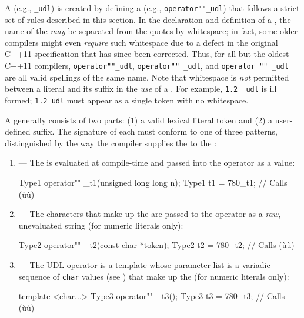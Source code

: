 A  (e.g., \lstinline!_udl!) is created by defining a
 (e.g., \lstinline!operator""_udl!) that follows a
strict set of rules described in this section. In the declaration and
definition of a , the name of the  \emph{may} be separated from the quotes by whitespace; in fact,
some older compilers might even \emph{require} such whitespace due to a
defect in the original C++11 specification that has since been
corrected. Thus, for all but the oldest C++11 compilers,
\lstinline!operator""_udl!, \lstinline!operator""!~\lstinline!_udl!, and
\lstinline!operator!~\lstinline!""!~\lstinline!_udl! are all valid spellings of
the same  name. Note that whitespace is \emph{not}
permitted between a literal and its suffix in the \emph{use} of a
. For example, \lstinline!1.2!~\lstinline!_udl! is ill formed;
\lstinline!1.2_udl! must appear as a single token with no whitespace.

A  generally consists of two parts: (1) a valid lexical
literal token and (2) a user-defined suffix. The signature of each
 must conform to one of three patterns,
distinguished by the way the compiler supplies the  to the :

\begin{enumerate}
\item{ — The  is evaluated at compile-time and passed into the operator as a value:
\begin{emcppslisting}
Type1 operator"" _t1(unsigned long long n);
Type1 t1 = 780_t1;  // Calls (ù{}ù)
\end{emcppslisting}
    }
\item{ — The characters that make up the  are passed to the operator as a \emph{raw}, unevaluated string (for numeric literals only):
\begin{emcppslisting}
Type2 operator"" _t2(const char *token);
Type2 t2 = 780_t2;  // Calls (ù{}ù)
\end{emcppslisting}
    }
\item{ — The UDL operator is a template whose parameter list is a variadic sequence of \lstinline!char! values (see ) that make up the  (for numeric literals only):
\begin{emcppslisting}
template <char...> Type3 operator"" _t3();
Type3 t3 = 780_t3;  // Calls (ù{}ù)
\end{emcppslisting}
    }
\end{enumerate}

